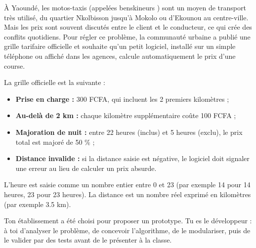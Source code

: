 \documentclass[11pt]{article}
\newcommand{\cle}[1]{{\popxbold\color{popdark}#1}}
\newcounter{popsec}
\newcounter{popsub}
\newcommand{\courssub}[1]{%
  \stepcounter{popsub}%
  \par\vspace{9pt}\noindent{\popxbold\fontsize{11.5}{13}\selectfont\color{popink}{\color{poporange}\thepopsec.\thepopsub}\hspace{6pt}#1}\par\nopagebreak\vspace{4pt}
}
\begin{document}
À Yaoundé, les motos-taxis (appelées \og benskineurs \fg) sont un moyen de transport très utilisé, du quartier Nkolbisson jusqu'à Mokolo ou d'Ekounou au centre-ville. Mais les prix sont souvent discutés entre le client et le conducteur, ce qui crée des conflits quotidiens. Pour régler ce problème, la communauté urbaine a publié une \cle{grille tarifaire officielle} et souhaite qu'un petit logiciel, installé sur un simple téléphone ou affiché dans les agences, calcule automatiquement le prix d'une course.

La grille officielle est la suivante :

\begin{itemize}
\item \textbf{Prise en charge :} \num{300} FCFA, qui incluent les \num{2} premiers kilomètres ;
\item \textbf{Au-delà de \num{2} km :} chaque kilomètre supplémentaire coûte \num{100} FCFA ;
\item \textbf{Majoration de nuit :} entre \num{22} heures (inclus) et \num{5} heures (exclu), le prix total est majoré de \num{50} \% ;
\item \textbf{Distance invalide :} si la distance saisie est négative, le logiciel doit signaler une erreur au lieu de calculer un prix absurde.
\end{itemize}

L'heure est saisie comme un \cle{nombre entier} entre \num{0} et \num{23} (par exemple \num{14} pour 14 heures, \num{23} pour 23 heures). La distance est un \cle{nombre réel} exprimé en kilomètres (par exemple \num{3,5} km).

Ton établissement a été choisi pour proposer un prototype. Tu es le développeur : à toi d'analyser le problème, de concevoir l'algorithme, de le modulariser, puis de le valider par des tests avant de le présenter à la classe.

\courssub{Consignes}
\end{document}
